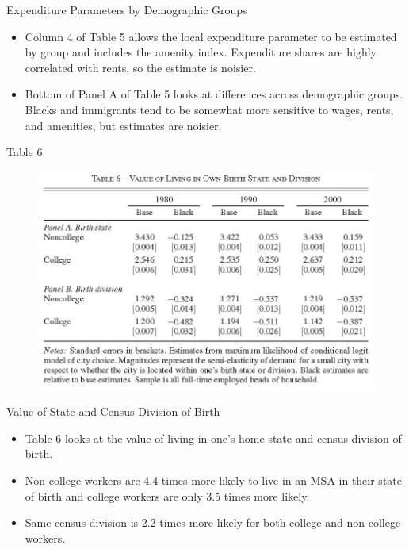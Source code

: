 \documentclass[aspectratio=169]{beamer}
\begin{document}
\begin{frame}{Expenditure Parameters by Demographic Groups}

\begin{itemize}
    \item<1-> Column 4 of Table 5 allows the local expenditure parameter to be estimated by group and includes the amenity index.  Expenditure shares are highly correlated with rents, so the estimate is noisier.
    \item<2-> Bottom of Panel A of Table 5 looks at differences across demographic groups.  Blacks and immigrants tend to be somewhat more sensitive to wages, rents, and amenities, but estimates are noisier.
\end{itemize}
    
\end{frame}


\begin{frame}{Table 6}

\begin{figure}
    \centering
    \includegraphics{DiamondTable6.jpg}
    \label{fig:Table6}
\end{figure}
    
\end{frame}


\begin{frame}{Value of State and Census Division of Birth}

\begin{itemize}
    \item<1-> Table 6 looks at the value of living in one’s home state and census division of birth.
    \item<2->  Non-college workers are 4.4 times more likely to live in an MSA in their state of birth and college workers are only 3.5 times more likely.
    \item<3-> Same census division is 2.2 times more likely for both college and non-college workers. 
\end{itemize}
    
\end{frame}
\end{document}
